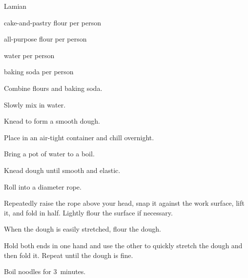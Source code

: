 \begin{recipe}{Lamian}{}{}

\begin{ingredients}
\item {} cake-and-pastry flour per person
\item {} all-purpose flour per person
\item {} water per person
\item {} baking soda per person
\end{ingredients}

\begin{directions}
\item Combine flours and baking soda.
\item Slowly mix in water.
\item Knead to form a smooth dough.
\item Place in an air-tight container and chill overnight.
\item Bring a pot of water to a boil.
\item Knead dough until smooth and elastic.
\item Roll into a  diameter rope.
\item Repeatedly raise the rope above your head, snap it against the work surface, lift it, and fold in half. Lightly flour the surface if necessary.
\item When the dough is easily stretched, flour the dough.
\item Hold both ends in one hand and use the other to quickly stretch the dough and then fold it. Repeat until the dough is fine.
\item Boil noodles for 3~minutes.
\end{directions}
\end{recipe}
